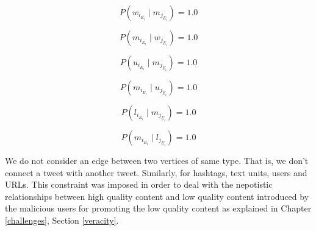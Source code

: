 \begin{equation}
P(w_{i_{E_{i}}} \mid m_{j_{E_{i}}}) = 1.0
\end{equation}

\begin{equation}
P(m_{i_{E_{i}}} \mid w_{j_{E_{i}}}) = 1.0
\end{equation}

\begin{equation}
P(u_{i_{E_{i}}} \mid m_{j_{E_{i}}}) = 1.0
\end{equation}

\begin{equation}
P(m_{i_{E_{i}}} \mid u_{j_{E_{i}}}) = 1.0
\end{equation}

\begin{equation}
P(l_{i_{E_{i}}} \mid m_{j_{E_{i}}}) = 1.0
\end{equation}

\begin{equation}
P(m_{i_{E_{i}}} \mid l_{j_{E_{i}}}) = 1.0
\end{equation}


We do not consider an edge between two vertices of same type. That is, we don't connect a tweet with another tweet. Similarly, for hashtags, text units, users and URLs. This constraint was imposed in order to deal with the nepotistic relationships between high quality content and low quality content introduced by the malicious users for promoting the low quality content as explained in Chapter \ref{challenges}, Section \ref{veracity}.  



